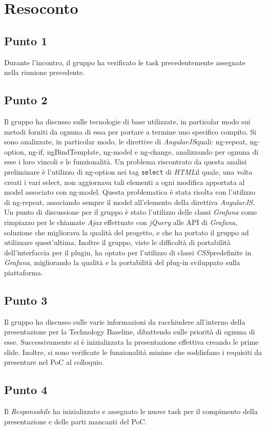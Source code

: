 \section{Resoconto}

\subsection{Punto 1}
Durante l'incontro, il gruppo ha verificato le task precedentemente assegnate nella riunione precedente. 

\subsection{Punto 2}
Il gruppo ha discusso sulle tecnologie di base utilizzate, in particolar modo sui metodi forniti da ognuna di essa per portare a termine uno specifico compito. Si sono analizzate, in particolar modo, le direttive di \textit{AngularJS}\glossario quali: ng-repeat, ng-option, ng-if, ngBindTemplate, ng-model e ng-change, analizzando per ognuna di esse i loro vincoli e le funzionalità. Un problema riscontrato da questa analisi preliminare è l'utilizzo di ng-option nei tag \texttt{select} di \textit{HTML}\glossario il quale, una volta creati i vari select, non aggiornava tali elementi a ogni modifica apportata al model associato con ng-model. Questa problematica è stata risolta con l'utilizzo di ng-repeat, associando sempre il model all'elemento della direttiva \textit{AngularJS}. Un punto di discussione per il gruppo è stato l'utilizzo delle classi \textit{Grafana} come rimpiazzo per le chiamate \textit{Ajax} effettuate con \textit{jQuery} alle API di \textit{Grafana}, soluzione che migliorava la qualità del progetto, e che ha portato il gruppo ad utilizzare quest'ultima. Inoltre il gruppo, viste le difficoltà di portabilità dell'interfaccia per il plugin, ha optato per l'utilizzo di classi \textit{CSS}\glossario predefinite in \textit{Grafana}, migliorando la qualità e la portabilità del plug-in sviluppato sulla piattaforma. 

\subsection{Punto 3}
Il gruppo ha discusso sulle varie informazioni da racchiudere all'interno della presentazione per la Technology Baseline, dibattendo sulle priorità di ognuna di esse. Successivamente si è inizializzata la presentazione effettiva creando le prime slide. Inoltre, si sono verificate le funzionalità minime che soddisfano i requisiti da presentare nel PoC al colloquio. 

\subsection{Punto 4}
Il \textit{Responsabile} ha inizializzato e assegnato le nuove task per il compimento della presentazione e delle parti mancanti del PoC. 
